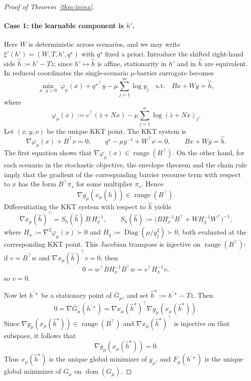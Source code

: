 \documentclass{article}
\theoremstyle{plain}
\theoremstyle{definition}
\theoremstyle{remark}
\begin{document}
\begin{proof}[Proof of Theorem~\ref{thm:invex}]
\paragraph{Case 1: the learnable component is \(h'\).}
Here \(W\) is deterministic across scenarios, and we may write \(\xi'(h')=(W,T,h',q^\star)\) with \(q^\star\) fixed a priori.
Introduce the shifted right-hand side \(\hat h:=h'-T\bar z\); since \(h'\mapsto \hat h\) is affine, stationarity in \(h'\) and in \(\hat h\) are equivalent.
In reduced coordinates the single-scenario \(\mu\)-barrier surrogate becomes
\[
\min_{x,\;y>0}\;
\varphi_\mu(x)+{q^\star}^\top y-\mu\sum_{j=1}^{m}\log y_j
\quad\text{s.t.}\quad
Bx+Wy=\hat h,
\]
where
\[
\varphi_\mu(x):=c^\top(\bar z+Nx)-\mu\sum_{j=1}^{n}\log(\bar z+Nx)_j.
\]
Let \((x,y,\nu)\) be the unique KKT point. The KKT system is
\[
\nabla \varphi_\mu(x)+B^\top \nu=0,
\qquad
q^\star-\mu y^{-1}+W^\top \nu=0,
\qquad
Bx+Wy=\hat h.
\]
The first equation shows that \(\nabla \varphi_\mu(x)\in \operatorname{range}(B^\top)\). On the other hand, for each scenario in the stochastic objective, the envelope theorem and the chain rule imply that the gradient of the corresponding barrier recourse term with respect to \(x\) has the form \(B^\top \pi_s\) for some multiplier \(\pi_s\). Hence
\[
\nabla g_\mu(x_\mu(\hat h))\in \operatorname{range}(B^\top).
\]
Differentiating the KKT system with respect to \(\hat h\) yields
\[
\nabla x_\mu(\hat h)^\top
=
S_h(\hat h)\,B\,H_x^{-1},
\qquad
S_h(\hat h):=
\big(BH_x^{-1}B^\top+WH_y^{-1}W^\top\big)^{-1},
\]
where \(H_x:=\nabla^2\varphi_\mu(x)\succ 0\) and \(H_y:=\operatorname{Diag}(\mu/y_j^2)\succ 0\), both evaluated at the corresponding KKT point.
This Jacobian transpose is injective on \(\operatorname{range}(B^\top)\): if \(v=B^\top w\) and \(\nabla x_\mu(\hat h)^\top v=0\), then
\[
0=w^\top B H_x^{-1} B^\top w = v^\top H_x^{-1} v,
\]
so \(v=0\).

Now let \(h^{\prime\star}\) be a stationary point of \(\bar G_\mu\), and set \(\hat h^\star:=h^{\prime\star}-T\bar z\). Then
\[
0=\nabla \bar G_\mu(h^{\prime\star})
=\nabla x_\mu(\hat h^\star)^\top \nabla g_\mu(x_\mu(\hat h^\star)).
\]
Since \(\nabla g_\mu(x_\mu(\hat h^\star))\in \operatorname{range}(B^\top)\) and \(\nabla x_\mu(\hat h^\star)^\top\) is injective on that subspace, it follows that
\[
\nabla g_\mu(x_\mu(\hat h^\star))=0.
\]
Thus \(x_\mu(\hat h^\star)\) is the unique global minimizer of \(g_\mu\), and \(F_\mu(h^{\prime\star})\) is the unique global minimizer of \(G_\mu\) on \(\operatorname{dom}(G_\mu)\).


\end{proof}
\end{document}
